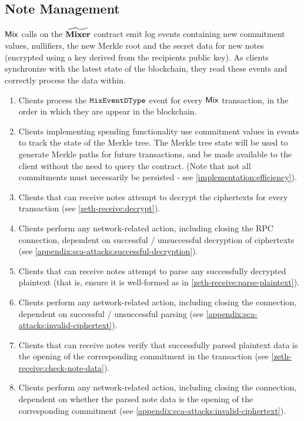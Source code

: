 \subsection{Note Management}\label{client-security:syncing:note-management}

$\mathsf{Mix}$ calls on the $\widetilde{\mathbf{Mixer}}$ contract emit log events containing new commitment values, nullifiers, the new Merkle root and the secret data for new notes (encrypted using a key derived from the recipients public key). As clients synchronize with the latest state of the blockchain, they \MUST{} read these events and correctly process the data within.

\begin{enumerate}
    \item Clients \MUST{} process the ${\mathtt{MixEventDType}}$ event for every $\mathsf{Mix}$ transaction, in the order in which they are appear in the blockchain.
    \item Clients implementing spending functionality \MUST{} use commitment values in events to track the state of the Merkle tree. The Merkle tree state will be used to generate Merkle paths for future transactions, and \MUST{} be made available to the client without the need to query the contract. (Note that not all commitments must necessarily be persisted - see \cref{implementation:efficiency}).
    \item Clients that can receive notes \MUST{} attempt to decrypt the ciphertexts for every transaction (see \cref{zeth-receive:decrypt}).
    \item Clients \MUSTNOT{} perform any network-related action, including closing the RPC connection, dependent on successful / unsuccessful decryption of ciphertexts (see \cref{appendix:sca-attacks:successful-decryption}).
    \item Clients that can receive notes \MUST{} attempt to parse any successfully decrypted plaintext (that is, ensure it is well-formed as in \cref{zeth-receive:parse-plaintext}).
    \item Clients \MUSTNOT{} perform any network-related action, including closing the connection, dependent on successful / unsuccessful parsing (see \cref{appendix:sca-attacks:invalid-ciphertext}).
    \item Clients that can receive notes \MUST{} verify that successfully parsed plaintext data is the opening of the corresponding commitment in the transaction (see \cref{zeth-receive:check-note-data}).
    \item Clients \MUSTNOT{} perform any network-related action, including closing the connection, dependent on whether the parsed note data is the opening of the corresponding commitment (see \cref{appendix:sca-attacks:invalid-ciphertext}).

\end{enumerate}
